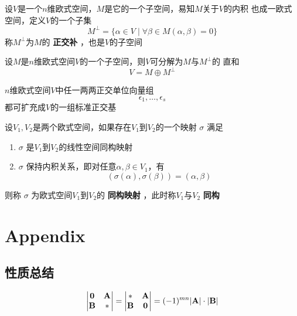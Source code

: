 \documentclass[11pt]{article}
\begin{document}
设\(V\)是一个\(n\)维欧式空间，\(M\)是它的一个子空间，易知\(M\)关于\(V\)的内积
也成一欧式空间，定义\(V\)的一个子集
\begin{equation*}
M^\bot=\{\alpha\in V\mid\forall\beta\in M(\alpha,\beta)=0\}
\end{equation*}
称\(M^\bot\)为\(M\)的 \textbf{正交补} ，也是\(V\)的子空间

\begin{proposition}[]
设\(M\)是\(n\)维欧式空间\(V\)的一个子空间，则\(V\)可分解为\(M\)与\(M^\bot\)的
直和
\begin{equation*}
 V=M\oplus M^\bot
\end{equation*}
\end{proposition}

\begin{corollary}[]
\(n\)维欧式空间\(V\)中任一两两正交单位向量组
\begin{equation*}
\epsilon_1,\dots,\epsilon_s
\end{equation*}
都可扩充成\(V\)的一组标准正交基
\end{corollary}

\begin{definition}[]
设\(V_1,V_2\)是两个欧式空间，如果存在\(V_1\)到\(V_2\)的一个映射 \(\sigma\) 满足
\begin{enumerate}
\item \(\sigma\) 是\(V_1\)到\(V_2\)的线性空间同构映射
\item \(\sigma\) 保持内积关系，即对任意\(\alpha,\beta\in V_1\)，有
\begin{equation*}
(\sigma(\alpha),\sigma(\beta))=(\alpha,\beta)
\end{equation*}
\end{enumerate}


则称 \(\sigma\) 为欧式空间\(V_1\)到\(V_2\)的 \textbf{同构映射} ，此时称\(V_1\)与\(V_2\) \textbf{同构}
\end{definition}






\section{Appendix}
\label{sec:org3692fa3}
\subsection{性质总结}
\label{sec:org927bc46}
\begin{equation*}
\begin{vmatrix}
\bzero&\bA\\\bB&*
\end{vmatrix}=
\begin{vmatrix}
*&\bA\\\bB&\bzero
\end{vmatrix}=
(-1)^{mn}\abs{\bA}\cdot\abs{\bB}
\end{equation*}
\end{document}
